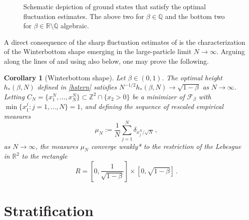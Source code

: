 \documentclass[reqno]{amsart}
\theoremstyle{plain}
\newtheorem{corollary}[theorem]{Corollary}
\theoremstyle{definition}
\numberwithin{equation}{section}
\newcommand{\Z}{\mathbb{Z}}
\newcommand{\R}{\mathbb{R}}
\begin{document}
\begin{figure}[htp]
\caption{Schematic depiction of ground states that satisfy the optimal fluctuation estimates. The above two for $\beta \in \mathbb{Q}$ and the bottom two for $\beta \in \mathbb{R}\setminus \mathbb{Q}$ algebraic.}
\label{Fig:fluctuations}
\end{figure}


A direct consequence of the sharp fluctuation estimates of
 is the characterization of the Winterbottom shape
emerging in the large-particle limit $N \to \infty$. Arguing along the
lines of \cite{Yuen} and using also  below, one may prove the
following.

\begin{corollary}[Winterbottom shape]
 Let $\beta \in  (0,1)  $.  The optimal height $ h_*(\beta,N)$ defined in \eqref{hstern} satisfies $N^{-1/2}h_*(\beta,N) \to \sqrt{1-\beta}$ as $N \to \infty$. Letting    $C_N =\{x_1^N,
 \dots, x_N^N\}
 \subset \Z^2 \cap \{x_2>0\}$ be a minimizer of $\mathcal{F}_\beta$
 with $\min\{x_1^j :  j=1,\dots,N\}=1$, and  defining  the sequence of rescaled
 empirical measures
 $$\mu_N := \frac{1}{N}\sum_{j=1}^N  \delta_{x^N_j/\sqrt{N}}\,,$$ 
as $N \to \infty$, the measures $\mu_N$ converge weakly* to the
restriction of the Lebesgue in $\R^2$ to the rectangle
$$R=\left[0,\frac{1}{\sqrt{1-\beta}}\right]\times [0,\sqrt{1-\beta}]\,.$$
\end{corollary}










 


\section{Stratification}\label{sec:mainproof}
\end{document}
